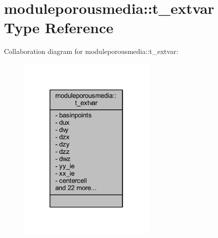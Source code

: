 \hypertarget{structmoduleporousmedia_1_1t__extvar}{}\section{moduleporousmedia\+:\+:t\+\_\+extvar Type Reference}
\label{structmoduleporousmedia_1_1t__extvar}


Collaboration diagram for moduleporousmedia\+:\+:t\+\_\+extvar\+:\nopagebreak
\begin{figure}[H]
\begin{center}
\leavevmode
\includegraphics[width=190pt]{structmoduleporousmedia_1_1t__extvar__coll__graph}
\end{center}
\end{figure}
